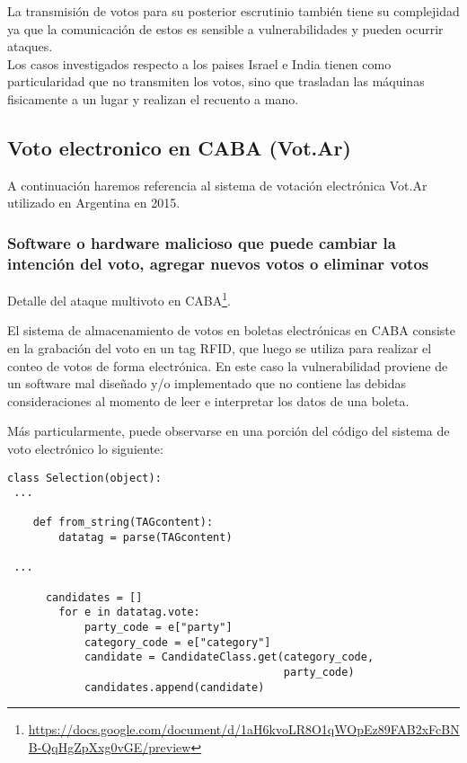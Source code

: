 La transmisión de votos para su posterior escrutinio también tiene su complejidad ya que la comunicación de estos es sensible a vulnerabilidades y pueden ocurrir ataques.\\
Los casos investigados respecto a los paises Israel e India tienen como particularidad que no transmiten los votos, sino que trasladan las máquinas fisicamente a un lugar y realizan el recuento a mano. \\

\subsection{Voto electronico en CABA (Vot.Ar)}
A continuación haremos referencia al sistema de votación electrónica Vot.Ar utilizado en Argentina en 2015.

\subsubsection{Software o hardware malicioso que puede cambiar la intención del voto, agregar nuevos votos o eliminar votos}
Detalle del ataque multivoto en CABA\footnote{\url{https://docs.google.com/document/d/1aH6kvoLR8O1qWOpEz89FAB2xFcBNB-QqHgZpXxg0vGE/preview}}.

El sistema de almacenamiento de votos en boletas electrónicas en CABA consiste en la grabación del voto en un tag RFID, que luego se utiliza para realizar el conteo de votos de forma electrónica. En este caso la vulnerabilidad proviene de un software mal diseñado y/o implementado que no contiene las debidas consideraciones al momento de leer e interpretar los datos de una boleta.

Más particularmente, puede observarse en una porción del código del sistema de voto electrónico lo siguiente:

\begin{lstlisting}
class Selection(object):
 ...

    def from_string(TAGcontent):
        datatag = parse(TAGcontent)

 ...

      candidates = []
        for e in datatag.vote:
            party_code = e["party"]
            category_code = e["category"]
            candidate = CandidateClass.get(category_code,
                                           party_code)
            candidates.append(candidate)

\end{lstlisting}


